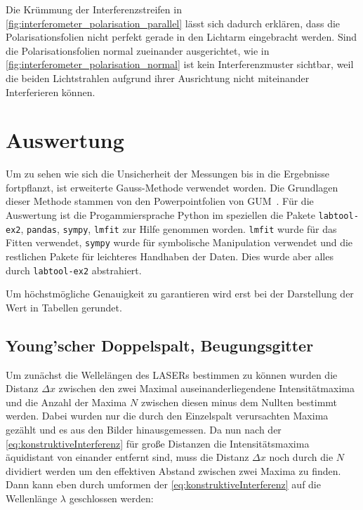 \documentclass[12pt,english,ngerman]{scrartcl}
\begin{document}
Die Krümmung der Interferenzstreifen in
\autoref{fig:interferometer_polarisation_parallel} lässt sich dadurch erklären,
dass die Polarisationsfolien nicht perfekt gerade in den Lichtarm eingebracht
werden. Sind die Polarisationsfolien normal zueinander ausgerichtet, wie in
\autoref{fig:interferometer_polarisation_normal} ist kein Interferenzmuster
sichtbar, weil die beiden Lichtstrahlen aufgrund ihrer Ausrichtung nicht
miteinander Interferieren können.

\section{Auswertung}\label{sec:auswertung}

Um zu sehen wie sich die Unsicherheit der Messungen bis in die Ergebnisse
fortpflanzt, ist erweiterte Gauss-Methode verwendet worden. Die Grundlagen
dieser Methode stammen von den Powerpointfolien von
GUM~\cite{wolfgangkesselISOBIPMGUMSicht2004}. Für die Auswertung ist die
Progammiersprache Python im speziellen die Pakete \verb#labtool-ex2#,
\verb#pandas#, \verb#sympy#, \verb#lmfit# zur Hilfe genommen worden.
\verb#lmfit# wurde für das Fitten verwendet, \verb#sympy# wurde für symbolische
Manipulation verwendet und die restlichen Pakete für leichteres Handhaben der
Daten. Dies wurde aber alles durch \verb#labtool-ex2# abstrahiert.

Um höchstmögliche Genauigkeit zu garantieren wird erst bei der Darstellung der
Wert in Tabellen gerundet.

\subsection{Young'scher Doppelspalt, Beugungsgitter}\label{sec:ausw_doppelt}

Um zunächst die Wellelängen des LASERs bestimmen zu können wurden die Distanz
$\Delta x$ zwischen den zwei Maximal auseinanderliegendene Intensitätmaxima und
die Anzahl der Maxima $N$ zwischen diesen minus dem Nullten bestimmt werden.
Dabei wurden nur die durch den Einzelspalt verursachten Maxima gezählt und es
aus den Bilder hinausgemessen. Da nun nach der
\autoref{eq:konstruktiveInterferenz} für große Distanzen die Intensitätsmaxima
äquidistant von einander entfernt sind, muss die Distanz $\Delta x$ noch durch
die $N$ dividiert werden um den effektiven Abstand zwischen zwei Maxima zu
finden. Dann kann eben durch umformen der \autoref{eq:konstruktiveInterferenz}
auf die Wellenlänge $\lambda$ geschlossen werden:
\end{document}
